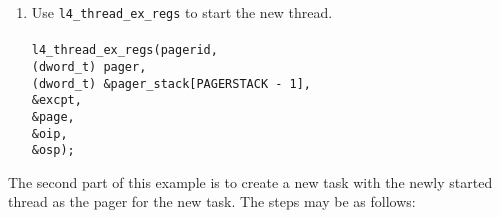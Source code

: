 \begin{enumerate}
\item Use {\footnotesize\verb+l4_thread_ex_regs+} to start the new thread. \\ \\
  \hspace*{10pt} {\footnotesize\verb+l4_thread_ex_regs(pagerid,+} \\
  \hspace*{105pt} {\footnotesize\verb+(dword_t) pager,+}\\
  \hspace*{105pt} {\footnotesize\verb+(dword_t) &pager_stack[PAGERSTACK - 1],+}\\
  \hspace*{105pt} {\footnotesize\verb+&excpt,+}\\
  \hspace*{105pt} {\footnotesize\verb+&page,+}\\
  \hspace*{105pt} {\footnotesize\verb+&oip,+}\\
  \hspace*{105pt} {\footnotesize\verb+&osp);+}
\end{enumerate}

The second part of this example is to create a new task with the newly
started thread as the pager for the new task. The steps may be as
follows:\label{s:ex-task}


